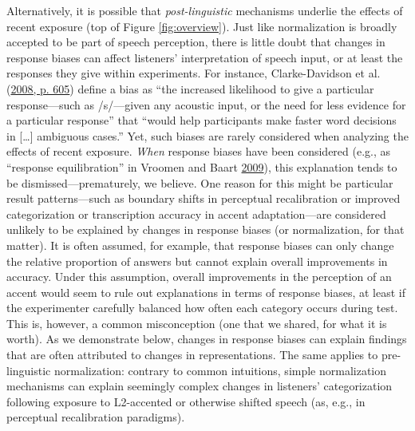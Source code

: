 \documentclass[
  11pt,
  english,
  man,floatsintext]{apa6}
\begin{document}
Alternatively, it is possible that \emph{post-linguistic} mechanisms underlie the effects of recent exposure (top of Figure \ref{fig:overview}). Just like normalization is broadly accepted to be part of speech perception, there is little doubt that changes in response biases can affect listeners' interpretation of speech input, or at least the responses they give within experiments. For instance, Clarke-Davidson et al. (\protect\hyperlink{ref-clarkedavidson2008}{2008, p. 605}) define a bias as ``the increased likelihood to give a particular response---such as /s/---given any acoustic input, or the need for less evidence for a particular response'' that ``would help participants make faster word decisions in {[}\ldots{]} ambiguous cases.'' Yet, such biases are rarely considered when analyzing the effects of recent exposure. \emph{When} response biases have been considered (e.g., as {``response equilibration''} in Vroomen and Baart \protect\hyperlink{ref-vroomen-baart2009}{2009}), this explanation tends to be dismissed---prematurely, we believe. One reason for this might be particular result patterns---such as boundary shifts in perceptual recalibration or improved categorization or transcription accuracy in accent adaptation---are considered unlikely to be explained by changes in response biases (or normalization, for that matter). It is often assumed, for example, that response biases can only change the relative proportion of answers but cannot explain overall improvements in accuracy. Under this assumption, overall improvements in the perception of an accent would seem to rule out explanations in terms of response biases, at least if the experimenter carefully balanced how often each category occurs during test. This is, however, a common misconception (one that we shared, for what it is worth). As we demonstrate below, changes in response biases can explain findings that are often attributed to changes in representations. The same applies to pre-linguistic normalization: contrary to common intuitions, simple normalization mechanisms can explain seemingly complex changes in listeners' categorization following exposure to L2-accented or otherwise shifted speech (as, e.g., in perceptual recalibration paradigms).
\end{document}
